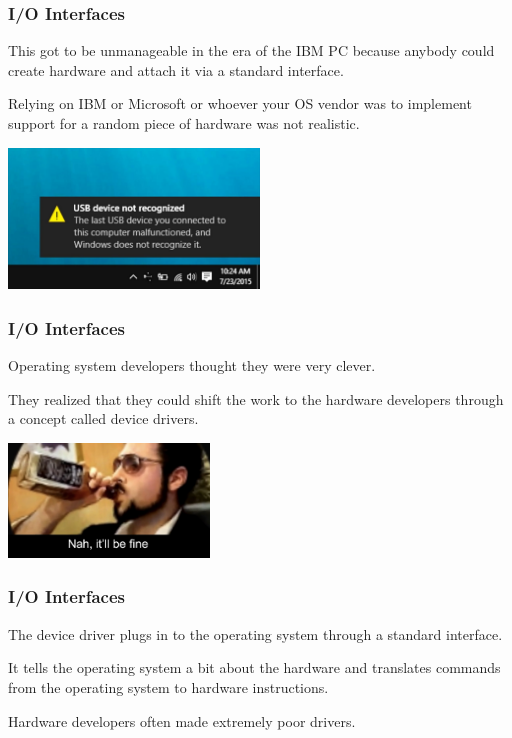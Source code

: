 \begin{frame}
\frametitle{I/O Interfaces} 

This got to be unmanageable in the era of the IBM PC because anybody could create hardware and attach it via a standard interface. 

Relying on IBM or Microsoft or whoever your OS vendor was to implement support for a random piece of hardware was not realistic.

\begin{center}
	\includegraphics[width=0.5\textwidth]{images/notrecognized.jpg}
\end{center}

\end{frame}

\begin{frame}
\frametitle{I/O Interfaces}

Operating system developers thought they were very clever. 

They realized that they could shift the work to the hardware developers through a concept called \alert{device drivers}. 

\begin{center}
	\includegraphics[width=0.4\textwidth]{images/befine.jpg}
\end{center}

\end{frame}

\begin{frame}
\frametitle{I/O Interfaces}

The device driver plugs in to the operating system through a standard interface. 

It tells the operating system a bit about the hardware and translates commands from the operating system to hardware instructions. 

Hardware developers often made extremely poor drivers.

\end{frame}

